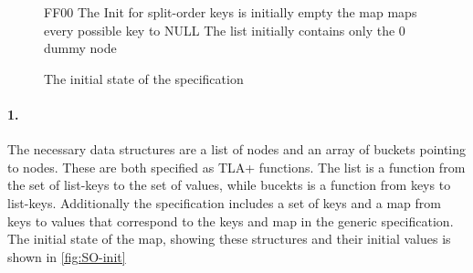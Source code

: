 \documentclass{uit-thesis}
\begin{document}
\begin{figure}
\begin{tla}
\end{tla}
\begin{tlatex}
%
\@pvspace{8.0pt}%
\@pvspace{8.0pt}%
\@pvspace{8.0pt}%
\@x{ {\ASSUME}}%
%
%
%
\@pvspace{8.0pt}%
\begin{lcom}{0}%
\begin{cpar}{0}{F}{F}{0}{0}{}%
The Init for split-order                          
 keys is initially empty                           
 the map maps every possible key to NULL           
 The list initially contains only the 0 dummy node 
\end{cpar}%
\end{lcom}%
%
%
%
%
%
\@pvspace{8.0pt}%
\end{tlatex}
\caption{The initial state of the specification}
\label{fig:SO-init}
\end{figure}
\paragraph{1.}The necessary data structures are a list of nodes and an array of buckets pointing to nodes. These are both specified as TLA+ functions. The list is a function from the set of list-keys to the set of values, while bucekts is a function from keys to list-keys. Additionally the specification includes a set of keys and a map from keys to values that correspond to the keys and map in the generic specification. The initial state of the map, showing these structures and their initial values is shown in \autoref{fig:SO-init}
\end{document}
